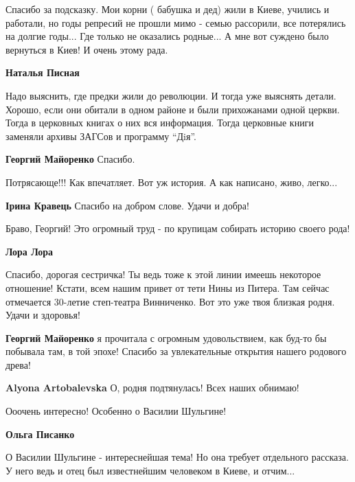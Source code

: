 \begin{itemize}
\begin{itemize}
Спасибо за подсказку. Мои корни ( бабушка и дед) жили в Киеве, учились и
работали, но годы репресий не прошли мимо - семью рассорили, все потерялись на
долгие годы... Где только не оказались родные... А мне вот суждено было вернуться
в Киев! И очень этому рада.

\textbf{Наталья Писная} 

Надо выяснить, где предки жили до революции. И тогда уже выяснять детали.
Хорошо, если они обитали в одном районе и были прихожанами одной церкви. Тогда
в церковных книгах о них вся информация. Тогда церковные книги заменяли архивы
ЗАГСов и программу \enquote{Дiя}.

\textbf{Георгий Майоренко} Спасибо.
\end{itemize} %

Потрясающе!!! Как впечатляет. Вот уж история. А как написано, живо, легко...

\textbf{Ірина Кравець} Спасибо на добром слове. Удачи и добра!


Браво, Георгий! Это огромный труд - по крупицам собирать историю своего рода!

\begin{itemize} %
\textbf{Лора Лора} 

Спасибо, дорогая сестричка! Ты ведь тоже к этой линии имеешь некоторое
отношение! Кстати, всем нашим привет от тети Нины из Питера. Там сейчас
отмечается 30-летие степ-театра Винниченко. Вот это уже твоя близкая родня.
Удачи и здоровья!


\textbf{Георгий Майоренко} я прочитала с огромным удовольствием, как буд-то бы побывала там, в той эпохе! Спасибо за увлекательные открытия нашего родового древа!

\textbf{Alyona Artobalevska} О, родня подтянулась! Всех наших обнимаю!
\end{itemize} %

Ооочень интересно! Особенно о Василии Шульгине!

\begin{itemize} %
\textbf{Ольга Писанко} 

О Василии Шульгине - интереснейшая тема! Но она требует отдельного рассказа. У
него ведь и отец был известнейшим человеком в Киеве, и отчим...

\end{itemize} %


\end{itemize}
